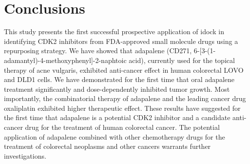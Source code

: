 \section{Conclusions}

This study presents the first successful prospective application of idock \citep{1153,1362} in identifying CDK2 inhibitors from FDA-approved small molecule drugs using a repurposing strategy. We have showed that adapalene (CD271, 6-[3-(1-adamantyl)-4-methoxyphenyl]-2-naphtoic acid), currently used for the topical therapy of acne vulgaris, exhibited anti-cancer effect in human colorectal LOVO and DLD1 cells. We have demonstrated for the first time that oral adapalene treatment significantly and dose-dependently inhibited tumor growth. Most importantly, the combinatorial therapy of adapalene and the leading cancer drug oxaliplatin exhibited higher therapeutic effect. These results have suggested for the first time that adapalene is a potential CDK2 inhibitor and a candidate anti-cancer drug for the treatment of human colorectal cancer. The potential application of adapalene combined with other chemotherapy drugs for the treatment of colorectal neoplasms and other cancers warrants further investigations.

\chapterend
